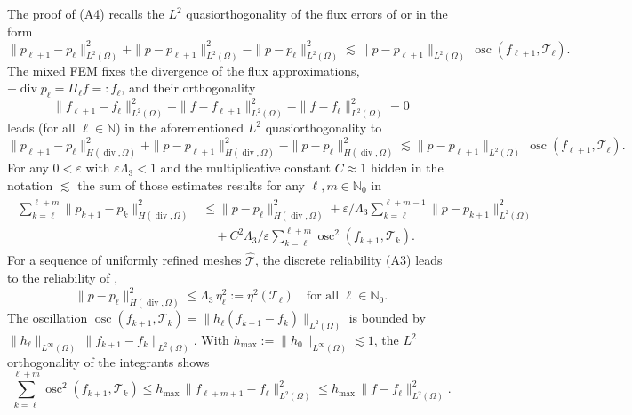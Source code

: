 \documentclass{siamltex1213}
\begin{document}
The proof of (A4) recalls the  $L^2$ quasiorthogonality of the flux errors of
\cite[Thm 3.2]{LCMHJX} or 
\cite[Lemma 4.3 and (4.4)]{CR09} in the form
\[
 \| p_{\ell+1} -p_{\ell}\|_{L^2(\Omega)}^2
 +\| p -p_{\ell+1}\|_{L^2(\Omega)}^2
 - \| p -p_{\ell}\|_{L^2(\Omega)}^2 
  \lesssim 
  \| p -p_{\ell+1}\|_{L^2(\Omega)}\, \operatorname{osc}(f_{\ell+1},{\mathcal{T}}_\ell).
\]
The mixed FEM fixes the divergence of the flux approximations, $-\operatorname{div} p_\ell=\Pi_\ell f=: f_\ell$, and their orthogonality
\[
 \| f_{\ell+1} -f_{\ell}\|_{L^2(\Omega)}^2
 +\| f -f_{\ell+1}\|_{L^2(\Omega)}^2
 - \| f -f_{\ell}\|_{L^2(\Omega)}^2 =0
\]
leads (for all $\ell\in\mathbb{N}$) in the aforementioned  $L^2$ quasiorthogonality to 
\[
 \| p_{\ell+1} -p_{\ell}\|_{H(\operatorname{div},\Omega)}^2
 +\| p -p_{\ell+1}\|_{H(\operatorname{div},\Omega)}^2
 - \| p -p_{\ell}\|_{H(\operatorname{div},\Omega)}^2 
  \lesssim 
  \| p -p_{\ell+1}\|_{L^2(\Omega)}\, \operatorname{osc}(f_{\ell+1},{\mathcal{T}}_\ell).
\]
For any $0<\varepsilon$ with $\varepsilon {\ensuremath{\Lambda_{\mathrm{3}}}}<1$ and the multiplicative constant $C\approx 1$ hidden in the notation $\lesssim$ 
the sum of those estimates results for any $\ell,m\in\mathbb{N}_0$ in 
\begin{align}\label{proofofa4inmfem}
	\begin{aligned}
		\sum_{k=\ell}^{\ell+m} \| p_{k+1} -p_{k}\|_{H(\operatorname{div},\Omega)}^2
		& \le  \| p -p_{\ell}\|_{H(\operatorname{div},\Omega)}^2 +   
\varepsilon/{\ensuremath{\Lambda_{\mathrm{3}}}} \sum_{k=\ell}^{\ell+m-1}  \| p -p_{k+1}\|_{L^2(\Omega)}^2 \\
&\quad 
+ C^2{\ensuremath{\Lambda_{\mathrm{3}}}}/\varepsilon \sum_{k=\ell}^{\ell+m}  \operatorname{osc}^2(f_{k+1},{\mathcal{T}}_k). 
\end{aligned}
\end{align}
For a sequence of uniformly refined meshes ${\hat{\mathcal{T}}}$, the discrete reliability (A3) leads  
to the reliability  of \cite{ccdpas2015}, 
\[
	\| p -p_{\ell}\|_{H(\operatorname{div},\Omega)}^2 \le {\ensuremath{\Lambda_{\mathrm{3}}}}\,\eta_\ell^2:=\eta^2({\mathcal{T}}_\ell)
 \quad\text{for all }\ell\in \mathbb{N}_0.
\]
The oscillation  $\operatorname{osc}(f_{k+1},{\mathcal{T}}_k)=\| h_\ell(f_{k+1}-f_k)\|_{L^2(\Omega)}$ is bounded by 
$\| h_\ell \|_{L^\infty(\Omega)}\, \| f_{k+1}-f_k\|_{L^2(\Omega)}$. 
With $h_{\max} :=  \| h_0 \|_{L^\infty(\Omega)} \lesssim 1$,
the $L^2$ orthogonality of the integrants shows
\[
 \sum_{k=\ell}^{\ell+m}  \operatorname{osc}^2(f_{k+1},{\mathcal{T}}_k)\le h_{\max} \, \| f_{\ell+m+1}-f_\ell\|_{L^2(\Omega)}^2
 \le h_{\max} \, \| f -f_\ell\|_{L^2(\Omega)}^2.
\]
\end{document}
